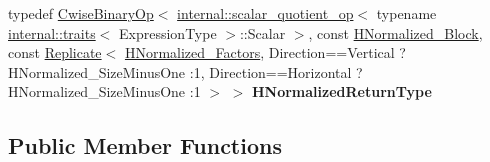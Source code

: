 \begin{DoxyCompactItemize}
typedef \mbox{\hyperlink{class_eigen_1_1_cwise_binary_op}{Cwise\+Binary\+Op}}$<$ \mbox{\hyperlink{struct_eigen_1_1internal_1_1scalar__quotient__op}{internal\+::scalar\+\_\+quotient\+\_\+op}}$<$ typename \mbox{\hyperlink{struct_eigen_1_1internal_1_1traits}{internal\+::traits}}$<$ Expression\+Type $>$\+::Scalar $>$, const \mbox{\hyperlink{class_eigen_1_1_block}{H\+Normalized\+\_\+\+Block}}, const \mbox{\hyperlink{class_eigen_1_1_replicate}{Replicate}}$<$ \mbox{\hyperlink{class_eigen_1_1_block}{H\+Normalized\+\_\+\+Factors}}, Direction==Vertical ? H\+Normalized\+\_\+\+Size\+Minus\+One \+:1, Direction==Horizontal ? H\+Normalized\+\_\+\+Size\+Minus\+One \+:1 $>$ $>$ {\bfseries H\+Normalized\+Return\+Type}
\end{DoxyCompactItemize}
\subsection*{Public Member Functions}
